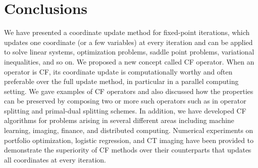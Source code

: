 \section{Conclusions}
We have presented a coordinate update method for fixed-point iterations, which updates one coordinate (or a few variables) at every iteration and can be applied to solve linear systems, optimization problems, saddle point problems, variational inequalities, and so on. We proposed a new concept called CF operator. When an operator is CF, its coordinate update is computationally worthy and often preferable over the full update method, in particular in a parallel computing setting. We gave examples of CF operators and also discussed how the properties can be preserved by composing two or more such operators such as in operator splitting and primal-dual splitting schemes. In addition, we have developed CF algorithms for problems arising in several different areas including machine learning, imaging, finance, and distributed computing. Numerical experiments on portfolio optimization, logistic regression, and CT imaging have been provided to demonstrate the superiority of CF methods over their counterparts that updates all coordinates at every iteration. 
